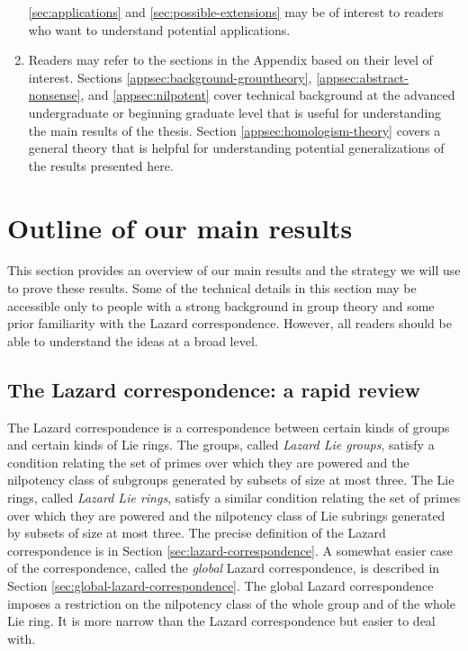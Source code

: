 \begin{enumerate}
  \ref{sec:applications} and \ref{sec:possible-extensions} may be of
  interest to readers who want to understand potential applications.
\item Readers may refer to the sections in the Appendix based on their
  level of interest. Sections \ref{appsec:background-grouptheory},
  \ref{appsec:abstract-nonsense}, and \ref{appsec:nilpotent} cover
  technical background at the advanced undergraduate or beginning
  graduate level that is useful for understanding the main results of
  the thesis. Section \ref{appsec:homologism-theory} covers a general
  theory that is helpful for understanding potential generalizations
  of the results presented here.
\end{enumerate}


\section{Outline of our main results}\label{sec:outline}

This section provides an overview of our main results and the strategy
we will use to prove these results. Some of the technical details in
this section may be accessible only to people with a strong background
in group theory and some prior familiarity with the Lazard
correspondence. However, all readers should be able to understand the
ideas at a broad level.

\subsection{The Lazard correspondence: a rapid review}

The Lazard correspondence is a correspondence between certain kinds of
groups and certain kinds of Lie rings. The groups, called {\em Lazard
  Lie groups}, satisfy a condition relating the set of primes over
which they are powered and the nilpotency class of subgroups generated
by subsets of size at most three. The Lie rings, called {\em Lazard
  Lie rings}, satisfy a similar condition relating the set of primes
over which they are powered and the nilpotency class of Lie subrings
generated by subsets of size at most three. The precise definition of
the Lazard correspondence is in Section
\ref{sec:lazard-correspondence}. A somewhat easier case of the
correspondence, called the {\em global} Lazard correspondence, is
described in Section \ref{sec:global-lazard-correspondence}. The
global Lazard correspondence imposes a restriction on the nilpotency
class of the whole group and of the whole Lie ring. It is more narrow
than the Lazard correspondence but easier to deal with.

